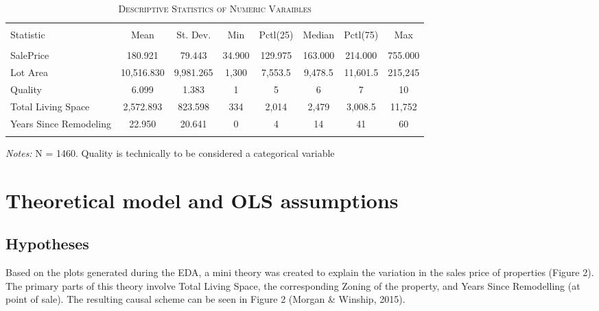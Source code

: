 \documentclass[a4paper]{article}
\begin{document}
\begin{table}[!htbp] 
\begin{adjustwidth}{-0cm}{-0cm}
\begin{threeparttable}
\small
\captionsetup{font=small, justification=raggedright,singlelinecheck=false}
\caption{\textsc{Descriptive Statistics of Numeric Varaibles}}
\centering 
  \label{}   
\begin{tabular}{@{\extracolsep{5pt}}lccccccc} 
\\[-5ex]\hline 
\hline \\[-1.8ex] 
Statistic & \multicolumn{1}{c}{Mean} & \multicolumn{1}{c}{St. Dev.} & \multicolumn{1}{c}{Min} & \multicolumn{1}{c}{Pctl(25)} & \multicolumn{1}{c}{Median} & \multicolumn{1}{c}{Pctl(75)} & \multicolumn{1}{c}{Max} \\ 
\hline \\[-1.8ex] 
SalePrice & 180.921 & 79.443 & 34.900 & 129.975 & 163.000 & 214.000 & 755.000 \\ 
Lot Area & 10,516.830 & 9,981.265 & 1,300 & 7,553.5 & 9,478.5 & 11,601.5 & 215,245 \\ 
Quality & 6.099 & 1.383 & 1 & 5 & 6 & 7 & 10 \\ 
Total Living Space & 2,572.893 & 823.598 & 334 & 2,014 & 2,479 & 3,008.5 & 11,752 \\ 
Years Since Remodeling & 22.950 & 20.641 & 0 & 4 & 14 & 41 & 60 \\ 
\hline \\[-3.5ex] 
\end{tabular} 
\begin{tablenotes}
      \small
      \item\textit{Notes:} N = 1460. Quality is technically to be considered a categorical variable
    \end{tablenotes}
\end{threeparttable}
\end{adjustwidth}
\end{table}

\section{Theoretical model and OLS assumptions}
\subsection{Hypotheses}
Based on the plots generated during the EDA, a mini theory was created to explain the variation in the sales price of properties (Figure 2). The primary parts of this theory involve Total Living Space, the corresponding Zoning of the property, and Years Since Remodelling (at point of sale). The resulting causal scheme can be seen in Figure 2 (Morgan \& Winship, 2015).
\end{document}
